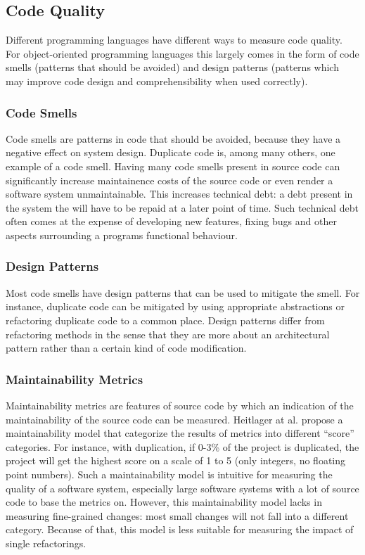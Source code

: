 \subsection{Code Quality}
Different programming languages have different ways to measure code quality. For object-oriented programming languages this largely comes in the form of code smells (patterns that should be avoided) and design patterns (patterns which may improve code design and comprehensibility when used correctly).

\subsubsection{Code Smells}
Code smells are patterns in code that should be avoided, because they have a negative effect on system design. Duplicate code is, among many others, one example of a code smell. Having many code smells present in source code can significantly increase maintainence costs of the source code or even render a software system unmaintainable. This increases technical debt: a debt present in the system the will have to be repaid at a later point of time. Such technical debt often comes at the expense of developing new features, fixing bugs and other aspects surrounding a programs functional behaviour.

\subsubsection{Design Patterns}
Most code smells have design patterns that can be used to mitigate the smell. For instance, duplicate code can be mitigated by using appropriate abstractions or refactoring duplicate code to a common place. Design patterns differ from refactoring methods in the sense that they are more about an architectural pattern rather than a certain kind of code modification.

\subsubsection{Maintainability Metrics}
Maintainability metrics are features of source code by which an indication of the maintainability of the source code can be measured. Heitlager at al. \cite{heitlager2007practical} propose a maintainability model that categorize the results of metrics into different ``score'' categories. For instance, with duplication, if 0-3\% of the project is duplicated, the project will get the highest score on a scale of 1 to 5 (only integers, no floating point numbers). Such a maintainability model is intuitive for measuring the quality of a software system, especially large software systems with a lot of source code to base the metrics on. However, this maintainability model \cite{heitlager2007practical} lacks in measuring fine-grained changes: most small changes will not fall into a different category. Because of that, this model is less suitable for measuring the impact of single refactorings.

